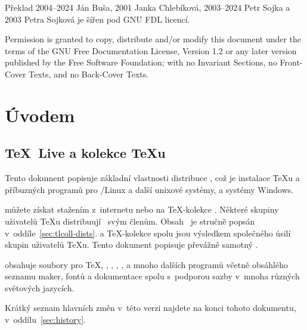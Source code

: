 \documentclass[\classoptions,slovak,english,czech]{\classname}
\newcommand\TKCS{\textsf{\TeX-kolekce}}
\begin{document}
\ifnum{}
  \thispagestyle{csbul}
  \ifforbulletin \setcounter{page}{113} %
  \else \raggedbottom
  \fi
\fi

Překlad 
  2004--2024 Ján Buša, 
  2001 Janka Chlebíková,
  2003--2024 Petr Sojka a 
  2003 Petra Sojková 
je šířen pod GNU FDL licencí.
  
Permission is granted to copy, distribute and/or modify this document
under the terms of the GNU Free Documentation License, Version 1.2
or any later version published by the Free Software Foundation;
with no Invariant Sections, no Front-Cover Texts, and no
Back-Cover Texts.

\bigskip  %


\tableofcontents

\section{Úvodem}
\label{sec:intro}

\subsection{\TeX\ Live a kolekce \TeX{}u}

Tento dokument popisuje základní vlastnosti distribuce \TeXLive{} \thisyear,
což je instalace \TeX{}u a příbuzných programů pro /Linux a další
unixové systémy, \macOS{} a systémy Windows.

\TL{} můžete získat stažením z~internetu nebo na \TKCS{} \DVD.
Některé skupiny uživatelů \TeX{}u distribuují \DVD\ svým členům. 
Obsah \DVD\ je stručně popsán v~oddíle~\ref{sec:tlcoll-dists}.
\TL{} a \TKCS{} spolu jsou výsledkem společného úsilí 
skupin uživatelů \TeX u. Tento dokument popisuje převážně samotný \TL{}.

\TL{} obsahuje  soubory pro \TeX, \LaTeXe, \ConTeXt, 
\MF, \MP, \BibTeX{} a mnoho dalších programů včetně obsáhlého
seznamu maker, fontů a dokumentace spolu s~podporou
sazby v~mnoha různých světových jazycích. 


Krátký seznam hlavních změn v~této verzi \TL{}
najdete na konci tohoto dokumentu, v~oddílu~\ref{sec:history}. 

\end{document}
